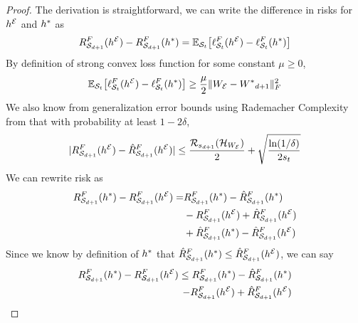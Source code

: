 \begin{theorem}
\begin{proof}
    The derivation is straightforward, we can write the difference in risks for $h^{\mathcal{E}}$ and $h^{*}$ as 
    \begin{align*}
        R_{\mathcal{S}_{d+1}}^F(h^{\mathcal{E}}) - R_{\mathcal{S}_{d+1}}^F(h^{*}) = \mathbb{E}_{\mathcal{S}_t}\big[\mathcal{\ell}_{\mathcal{S}_t}^F(h^{\mathcal{E}}) - \mathcal{\ell}_{\mathcal{S}_t}^F(h^*)\big]
    \end{align*}
    By definition of strong convex loss function for some constant $\mu\geq0$, 
    \begin{align*}
        \mathbb{E}_{\mathcal{S}_t}\big[\mathcal{\ell}_{\mathcal{S}_t}^F(h^{\mathcal{E}}) - \mathcal{\ell}_{\mathcal{S}_t}^F(h^*)\big] \geq \frac{\mu}{2}\lVert W_{\mathcal{E}} - {W^*}_{d+1}\Vert^2_F
    \end{align*}
    We also know from generalization error bounds using Rademacher Complexity from \cite{bartlett2003rademacher} that with probability at least $1-2\delta$, 
    \begin{align*}
        |R_{\mathcal{S}_{d+1}}^F(h^{\mathcal{E}}) - \hat{R}_{\mathcal{S}_{d+1}}^F(h^{\mathcal{E}})| \leq \frac{\mathcal{R}_{s_{d+1}}(\mathcal{H}_{W_{\mathcal{E}}})}{2} + \sqrt{\frac{\ln(1/\delta)}{2s_t}}  
    \end{align*}
    We can rewrite risk as
    \begin{align*}
        R_{\mathcal{S}_{d+1}}^F(h^{*}) - R_{\mathcal{S}_{d+1}}^F(h^{\mathcal{E}}) =& R_{\mathcal{S}_{d+1}}^F(h^{*}) - \hat{R}_{\mathcal{S}_{d+1}}^F(h^{*})\\ 
        &- R_{\mathcal{S}_{d+1}}^F(h^{\mathcal{E}}) + \hat{R}_{\mathcal{S}_{d+1}}^F(h^{\mathcal{E}})\\
        &+ \hat{R}_{\mathcal{S}_{d+1}}^F(h^{*}) - \hat{R}_{\mathcal{S}_{d+1}}^F(h^{\mathcal{E}})
    \end{align*}
    Since we know by definition of $h^{*}$ that $\hat{R}_{\mathcal{S}_{d+1}}^F(h^{*}) \leq \hat{R}_{\mathcal{S}_{d+1}}^F(h^{\mathcal{E}})$, we can say
    \begin{align*}
        R_{\mathcal{S}_{d+1}}^F(h^{*}) - R_{\mathcal{S}_{d+1}}^F(h^{\mathcal{E}}) \leq R_{\mathcal{S}_{d+1}}^F(h^{*}) - \hat{R}_{\mathcal{S}_{d+1}}^F(h^{*})\\ 
        - R_{\mathcal{S}_{d+1}}^F(h^{\mathcal{E}}) + \hat{R}_{\mathcal{S}_{d+1}}^F(h^{\mathcal{E}})
    \end{align*}
    

\end{proof}
\end{theorem}

